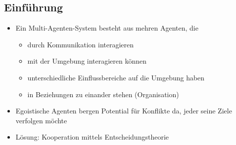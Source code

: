 \documentclass{article} %
\begin{document}
	\subsection{Einführung}
	\begin{itemize}
		\item Ein Multi-Agenten-System besteht aus mehren Agenten, die
		\begin{itemize}
			\item durch Kommunikation interagieren
			\item mit der Umgebung interagieren können
			\item unterschiedliche Einflussbereiche auf die Umgebung haben
			\item in Beziehungen zu einander stehen (Organisation)
		\end{itemize}
		\item Egoistische Agenten bergen Potential für Konflikte da, jeder seine Ziele verfolgen möchte
		\item Lösung: Kooperation mittels Entscheidungstheorie
	\end{itemize}
\end{document}
